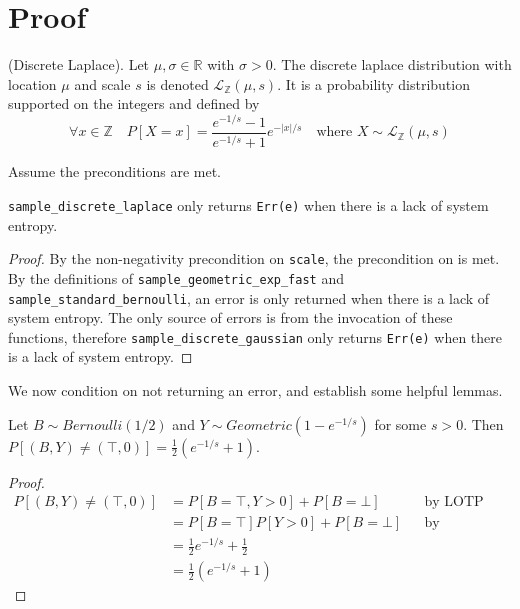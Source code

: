 \documentclass{article}
\begin{document}
\section{Proof}
\begin{definition} \cite{BV17}
    (Discrete Laplace). Let $\mu, \sigma \in \mathbb{R}$ with $\sigma > 0$. 
    The discrete laplace distribution with location $\mu$ and scale $s$ is denoted $\mathcal{L}_\mathbb{Z}(\mu, s)$. 
    It is a probability distribution supported on the integers and defined by
    \begin{equation*}
        \forall x \in \mathbb{Z} \quad  P[X = x] = \frac{e^{-1/s} - 1}{e^{-1/s} + 1} e^{-|x|/s} \quad \text{where } X \sim \mathcal{L}_\mathbb{Z}(\mu, s)
    \end{equation*}
\end{definition}

Assume the preconditions are met.

\begin{lemma}
    \label{err-e}
    \texttt{sample\_discrete\_laplace} only returns \texttt{Err(e)} when there is a lack of system entropy.
\end{lemma}

\begin{proof}
    By the non-negativity precondition on \texttt{scale},
    the precondition on  is met.
    By the definitions of \texttt{sample\_geometric\_exp\_fast} and \texttt{sample\_standard\_bernoulli}, 
    an error is only returned when there is a lack of system entropy.
    The only source of errors is from the invocation of these functions,
    therefore \texttt{sample\_discrete\_gaussian} only returns \texttt{Err(e)} when there is a lack of system entropy.
\end{proof}

We now condition on not returning an error, and establish some helpful lemmas.
\begin{lemma}\cite{CKS20}\label{P_B_Y_ne_T_0}
    Let $B \sim Bernoulli(1/2)$ and $Y \sim Geometric(1 - e^{-1/s})$ for some $s > 0$. 
    Then $P[(B, Y) \neq (\top, 0)] = \frac{1}{2} (e^{-1/s} + 1)$.
\end{lemma}

\begin{proof}
    \begin{align*}
        P[(B, Y) \neq (\top, 0)] &= P[B = \top, Y > 0] + P[B = \bot] && \text{by LOTP} \\
        &= P[B = \top] P[Y > 0] + P[B = \bot] && \text{by independence of B, Y} \\
        &= \frac{1}{2} e^{-1/s} + \frac{1}{2} \\
        &= \frac{1}{2} (e^{-1/s} + 1)
    \end{align*}
\end{proof}
\end{document}

